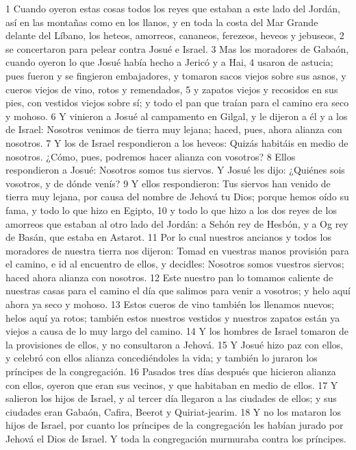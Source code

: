 1 Cuando oyeron estas cosas todos los reyes que estaban a este lado del Jordán, así en las montañas como en los llanos, y en toda la costa del Mar Grande delante del Líbano, los heteos, amorreos, cananeos, ferezeos, heveos y jebuseos,
2 se concertaron para pelear contra Josué e Israel.
3 Mas los moradores de Gabaón, cuando oyeron lo que Josué había hecho a Jericó y a Hai,
4 usaron de astucia; pues fueron y se fingieron embajadores, y tomaron sacos viejos sobre sus asnos, y cueros viejos de vino, rotos y remendados,
5 y zapatos viejos y recosidos en sus pies, con vestidos viejos sobre sí; y todo el pan que traían para el camino era seco y mohoso.
6 Y vinieron a Josué al campamento en Gilgal, y le dijeron a él y a los de Israel: Nosotros venimos de tierra muy lejana; haced, pues, ahora alianza con nosotros.
7 Y los de Israel respondieron a los heveos: Quizás habitáis en medio de nosotros. ¿Cómo, pues, podremos hacer alianza con vosotros?
8 Ellos respondieron a Josué: Nosotros somos tus siervos. Y Josué les dijo: ¿Quiénes sois vosotros, y de dónde venís?
9 Y ellos respondieron: Tus siervos han venido de tierra muy lejana, por causa del nombre de Jehová tu Dios; porque hemos oído su fama, y todo lo que hizo en Egipto,
10 y todo lo que hizo a los dos reyes de los amorreos que estaban al otro lado del Jordán: a Sehón rey de Hesbón, y a Og rey de Basán, que estaba en Astarot. 
11 Por lo cual nuestros ancianos y todos los moradores de nuestra tierra nos dijeron: Tomad en vuestras manos provisión para el camino, e id al encuentro de ellos, y decidles: Nosotros somos vuestros siervos; haced ahora alianza con nosotros.
12 Este nuestro pan lo tomamos caliente de nuestras casas para el camino el día que salimos para venir a vosotros; y helo aquí ahora ya seco y mohoso.
13 Estos cueros de vino también los llenamos nuevos; helos aquí ya rotos; también estos nuestros vestidos y nuestros zapatos están ya viejos a causa de lo muy largo del camino.
14 Y los hombres de Israel tomaron de la provisiones de ellos, y no consultaron a Jehová.
15 Y Josué hizo paz con ellos, y celebró con ellos alianza concediéndoles la vida; y también lo juraron los príncipes de la congregación.
16 Pasados tres días después que hicieron alianza con ellos, oyeron que eran sus vecinos, y que habitaban en medio de ellos.
17 Y salieron los hijos de Israel, y al tercer día llegaron a las ciudades de ellos; y sus ciudades eran Gabaón, Cafira, Beerot y Quiriat-jearim.
18 Y no los mataron los hijos de Israel, por cuanto los príncipes de la congregación les habían jurado por Jehová el Dios de Israel. Y toda la congregación murmuraba contra los príncipes.
